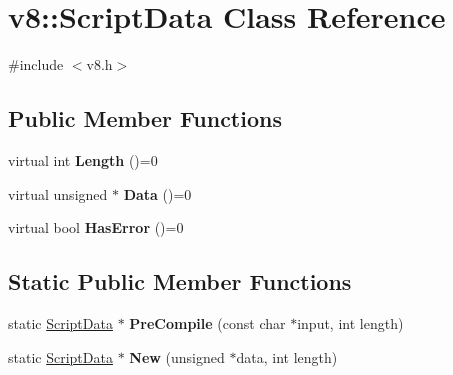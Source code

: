 \hypertarget{classv8_1_1_script_data}{}\section{v8\+:\+:Script\+Data Class Reference}
\label{classv8_1_1_script_data}


{\ttfamily \#include $<$v8.\+h$>$}

\subsection*{Public Member Functions}
\begin{DoxyCompactItemize}
\item 
\hypertarget{classv8_1_1_script_data_a6aa1007dfe6b09a5e59443bb1afff0b9}{}virtual int {\bfseries Length} ()=0\label{classv8_1_1_script_data_a6aa1007dfe6b09a5e59443bb1afff0b9}

\item 
\hypertarget{classv8_1_1_script_data_ae3c47fd599a27b5d155328f792765f65}{}virtual unsigned $\ast$ {\bfseries Data} ()=0\label{classv8_1_1_script_data_ae3c47fd599a27b5d155328f792765f65}

\item 
\hypertarget{classv8_1_1_script_data_ab5cea77b299b7dd73b7024fb114fd7e4}{}virtual bool {\bfseries Has\+Error} ()=0\label{classv8_1_1_script_data_ab5cea77b299b7dd73b7024fb114fd7e4}

\end{DoxyCompactItemize}
\subsection*{Static Public Member Functions}
\begin{DoxyCompactItemize}
\item 
\hypertarget{classv8_1_1_script_data_a4bb3cdd4abbde99a000a0c25b6357520}{}static \hyperlink{classv8_1_1_script_data}{Script\+Data} $\ast$ {\bfseries Pre\+Compile} (const char $\ast$input, int length)\label{classv8_1_1_script_data_a4bb3cdd4abbde99a000a0c25b6357520}

\item 
\hypertarget{classv8_1_1_script_data_a09ee27bc117e1583c214796f5e34f9e8}{}static \hyperlink{classv8_1_1_script_data}{Script\+Data} $\ast$ {\bfseries New} (unsigned $\ast$data, int length)\label{classv8_1_1_script_data_a09ee27bc117e1583c214796f5e34f9e8}

\end{DoxyCompactItemize}


